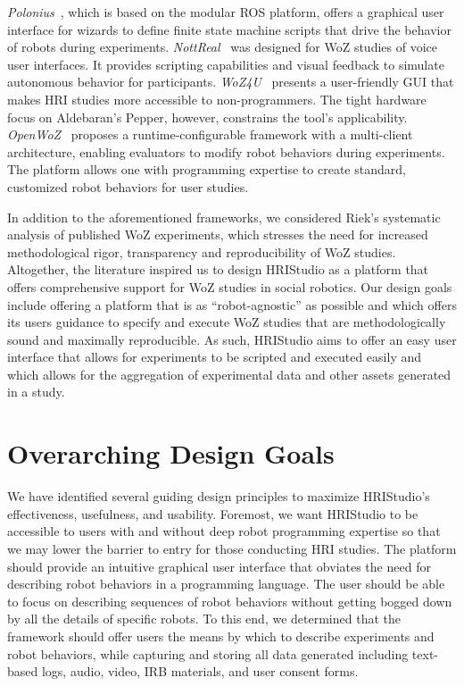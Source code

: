 \documentclass[letterpaper, 10 pt, conference]{ieeeconf}
\begin{document}
\emph{Polonius}~\cite{Lu2011}, which is based on the modular ROS platform, offers a graphical user interface for wizards to define finite state machine scripts that drive the behavior of robots during experiments. \emph{NottReal}~\cite{Porcheron2020} was designed for WoZ studies of voice user interfaces. It provides scripting capabilities and visual feedback to simulate autonomous behavior for participants. \emph{WoZ4U}~\cite{Rietz2021} presents a user-friendly GUI that makes HRI studies more accessible to non-programmers. The tight hardware focus on Aldebaran's Pepper, however, constrains the tool's applicability. \emph{OpenWoZ}~\cite{Hoffman2016} proposes a runtime-configurable framework with a multi-client architecture, enabling evaluators to modify robot behaviors during experiments. The platform allows one with programming expertise to create standard, customized robot behaviors for user studies.

In addition to the aforementioned frameworks, we considered Riek's systematic analysis of published WoZ experiments, which stresses the need for increased methodological rigor, transparency and reproducibility of WoZ studies.~\cite{Riek2012} Altogether, the literature inspired us to design HRIStudio as a platform that offers comprehensive support for WoZ studies in social robotics. Our design goals include offering a platform that is as ``robot-agnostic'' as possible and which offers its users guidance to specify and execute WoZ studies that are methodologically sound and maximally reproducible. As such, HRIStudio aims to offer an easy user interface that allows for experiments to be scripted and executed easily and which allows for the aggregation of experimental data and other assets generated in a study.

\section{Overarching Design Goals}

We have identified several guiding design principles to maximize HRIStudio's effectiveness, usefulness, and usability. Foremost, we want HRIStudio to be accessible to users with and without deep robot programming expertise so that we may lower the barrier to entry for those conducting HRI studies. The platform should provide an intuitive graphical user interface that obviates the need for describing robot behaviors in a programming language. The user should be able to focus on describing sequences of robot behaviors without getting bogged down by all the details of specific robots. To this end, we determined that the framework should offer users the means by which to describe experiments and robot behaviors, while capturing and storing all data generated including text-based logs, audio, video, IRB materials, and user consent forms. 
\end{document}

